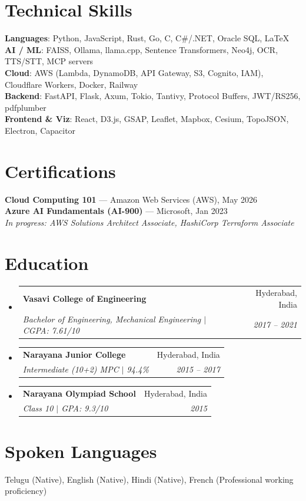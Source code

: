 \documentclass[letterpaper,11pt]{article}
\makeatletter
\newcommand{\resumeSubheading}[4]{
  \vspace{-2pt}\item
    \begin{tabular*}{0.97\textwidth}[t]{l@{\extracolsep{\fill}}r}
      \textbf{#1} & #2 \\
      \textit{\small#3} & \textit{\small #4} \\
    \end{tabular*}\vspace{-7pt}
}
\newcommand{\resumeSubHeadingListStart}{\begin{itemize}[leftmargin=0.15in, label={}]}
\newcommand{\resumeSubHeadingListEnd}{\end{itemize}}
\makeatother
\begin{document}
\section{Technical Skills}
 \begin{itemize}[leftmargin=0.15in, label={}]
    \small{\item{
     \textbf{Languages}{: Python, JavaScript, Rust, Go, C, C\#/.NET, Oracle SQL, LaTeX} \\
     \textbf{AI / ML}{: FAISS, Ollama, llama.cpp, Sentence Transformers, Neo4j, OCR, TTS/STT, MCP servers} \\
     \textbf{Cloud}{: AWS (Lambda, DynamoDB, API Gateway, S3, Cognito, IAM), Cloudflare Workers, Docker, Railway} \\
     \textbf{Backend}{: FastAPI, Flask, Axum, Tokio, Tantivy, Protocol Buffers, JWT/RS256, pdfplumber} \\
     \textbf{Frontend \& Viz}{: React, D3.js, GSAP, Leaflet, Mapbox, Cesium, TopoJSON, Electron, Capacitor}
    }}
 \end{itemize}

\section{Certifications}
 \begin{itemize}[leftmargin=0.15in, label={}]
    \small{\item{
     \textbf{Cloud Computing 101} --- Amazon Web Services (AWS), May 2026 \\
     \textbf{Azure AI Fundamentals (AI-900)} --- Microsoft, Jan 2023 \\
     \textit{In progress: AWS Solutions Architect Associate, HashiCorp Terraform Associate}
    }}
 \end{itemize}

\section{Education}
  \resumeSubHeadingListStart
    \resumeSubheading
      {Vasavi College of Engineering}{Hyderabad, India}
      {Bachelor of Engineering, Mechanical Engineering $|$ CGPA: 7.61/10}{2017 -- 2021}
    \resumeSubheading
      {Narayana Junior College}{Hyderabad, India}
      {Intermediate (10+2) MPC $|$ 94.4\%}{2015 -- 2017}
    \resumeSubheading
      {Narayana Olympiad School}{Hyderabad, India}
      {Class 10 $|$ GPA: 9.3/10}{2015}
  \resumeSubHeadingListEnd

\section{Spoken Languages}
 \begin{itemize}[leftmargin=0.15in, label={}]
    \small{\item{
     Telugu (Native), English (Native), Hindi (Native), French (Professional working proficiency)
    }}
 \end{itemize}
\end{document}
